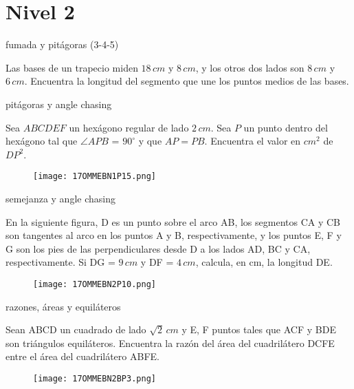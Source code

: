 \section{Nivel 2}

fumada y pitágoras (3-4-5)

\begin{sproblem}[OMMEB 2017]
    Las bases de un trapecio miden \(18\, cm\) y \(8\, cm\), y 
    los otros dos lados son \(8\, cm\) y \(6\, cm\). Encuentra 
    la longitud del segmento que une los puntos medios de las 
    bases.
\end{sproblem}

pitágoras y angle chasing

\begin{problem}[OMMEB 2017]
    Sea $ABCDEF$ un hexágono regular de lado \(2\, cm\). 
    Sea $P$ un punto dentro del hexágono tal que 
    $\angle APB$ = \(90^\circ\) y que $AP = PB$. 
    Encuentra el valor en $cm^2$ de $DP^2$.
\end{problem}

\begin{figure}[h]
    \centering
    \texttt{[image: 17OMMEBN1P15.png]}
\end{figure}

semejanza y angle chasing

\begin{problem}[OMMEB 2017]
    En la siguiente figura, D es un punto sobre el arco AB, 
    los segmentos CA y CB son tangentes al arco en los puntos A 
    y B, respectivamente, y los puntos E, F y G son los pies de 
    las perpendiculares desde D a los lados AD, BC y CA, 
    respectivamente. Si DG = \(9\, cm\) y DF = \(4\, cm\), 
    calcula, en cm, la longitud DE.
\end{problem}

\begin{figure}[h]
    \centering
    \texttt{[image: 17OMMEBN2P10.png]}
\end{figure}

razones, áreas y equiláteros

\begin{problem}[OMMEB 2017]
    Sean ABCD un cuadrado de lado \(\sqrt{2}\, cm\) y E, F 
    puntos tales que ACF y BDE son triángulos equiláteros.
    Encuentra la razón del área del cuadrilátero DCFE entre el 
    área del cuadrilátero ABFE.
\end{problem}

\begin{figure}[h]
    \centering
    \texttt{[image: 17OMMEBN2BP3.png]}
\end{figure}

